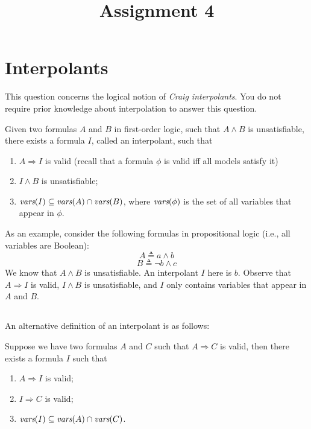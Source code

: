 \documentclass[11pt, oneside]{article}   	%
\title{Assignment 4}
\begin{document}
\maketitle

\section{Interpolants}

This question concerns the logical notion
of \emph{Craig interpolants}.
You do not require prior knowledge about interpolation
to answer this question.

Given two formulas $A$ and $B$ in first-order logic,
such that $A \land B$ is unsatisfiable,
there exists a formula $I$, called an interpolant, such that
\begin{enumerate}
    \item $A \Rightarrow I$ is valid (recall that a formula $\phi$ is valid iff all models satisfy it)
    \item $I \land B$ is unsatisfiable;
    \item $\emph{vars}(I) \subseteq \emph{vars}(A) \cap \emph{vars}(B)$,
        where $\emph{vars}(\phi)$ is the set of all variables
        that appear in $\phi$.
\end{enumerate}

As an example, consider the following formulas
in propositional logic (i.e., all variables are Boolean):
%
$$A \triangleq a \land b$$
$$B \triangleq \neg b \land c$$
%
We know that $A \land B$ is unsatisfiable.
An interpolant $I$ here is $b$. Observe that
$A \Rightarrow I$ is valid, $I \land  B$ is unsatisfiable,
and $I$ only contains variables that appear in $A$ and $B$.


\subsection{}
An alternative definition of an interpolant
is as follows:

Suppose we have two formulas $A$ and $C$
such that $A \Rightarrow C$ is valid, then
there exists a formula $I$ such that
\begin{enumerate}
    \item $A \Rightarrow I$ is valid;
    \item $I \Rightarrow C$ is valid;
    \item $\emph{vars}(I) \subseteq \emph{vars}(A) \cap \emph{vars}(C)$.
\end{enumerate}
\end{document}
